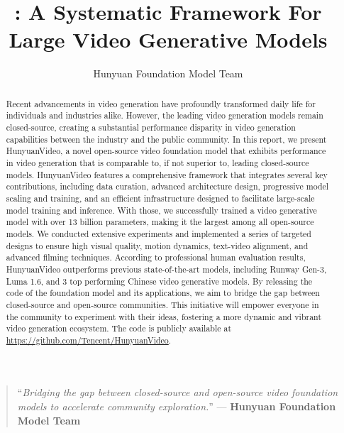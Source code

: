 \documentclass{article}
\title{\nameofmethod{}: A Systematic Framework For Large Video Generative Models}
\newcommand{\nameofmethod}{HunyuanVideo}
\begin{document}
\maketitle

\vspace{-20mm}
\begin{quote}
\vspace{-1mm}
\author{Hunyuan Foundation Model Team}
    ``\textit{Bridging the gap between closed-source and open-source video foundation models to accelerate community exploration.}'' \hfill --- \textbf{Hunyuan Foundation Model Team }
\vspace{-1mm}
\end{quote}


\begin{abstract}
Recent advancements in video generation have profoundly transformed daily life for individuals and industries alike. However, the leading video generation models remain closed-source, creating a substantial performance disparity in video generation capabilities between the industry and the public community. 
%
In this report, we present \nameofmethod{}, a novel open-source video foundation model that exhibits performance in video generation that is comparable to, if not superior to, leading closed-source models. \nameofmethod{} features a comprehensive framework that integrates several key contributions, including data curation, advanced architecture design, progressive model scaling and training, and an efficient infrastructure designed to facilitate large-scale model training and inference.
%
With those, we successfully trained a video generative model with over 13 billion parameters, making it the largest among all open-source models. 
%
We conducted extensive experiments and implemented a series of targeted designs to ensure high visual quality, motion dynamics, text-video alignment, and advanced filming techniques. According to professional human evaluation results, \nameofmethod{} outperforms previous state-of-the-art models, including Runway Gen-3, Luma 1.6, and 3 top performing Chinese video generative models. By releasing the code of the foundation model and its applications, we aim to bridge the gap between closed-source and open-source communities. This initiative will empower everyone in the community to experiment with their ideas, fostering a more dynamic and vibrant video generation ecosystem. The code is publicly available at \url{https://github.com/Tencent/HunyuanVideo}.
\end{abstract}
\end{document}
